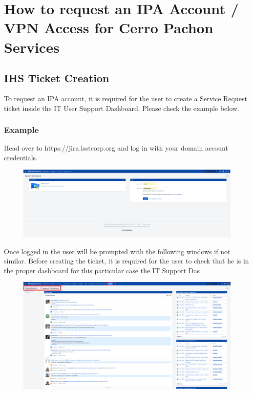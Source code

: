 \newpage

\section{How to request an IPA Account / VPN Access for Cerro Pachon Services}

\subsection{IHS Ticket Creation}
  
  To request an IPA account, it is required for the user to create a Service Request ticket inside the IT User Support Dashboard.
  Please check the example below.

\subsubsection{Example}

  Head over to https://jira.lsstcorp.org and log in with your domain account credentials.

\begin{figure}
  \includegraphics[width=15cm]{Images/example1.png}
  \centering
\end{figure}

\newpage

Once logged in the user will be prompted with the following windows if not similar. Before creating the ticket,  it is required for the user to check that he is in the proper dashboard for this particular case the IT Support Das

\begin{figure}
  \includegraphics[width=15cm]{Images/example2.png}
  \centering
\end{figure}

